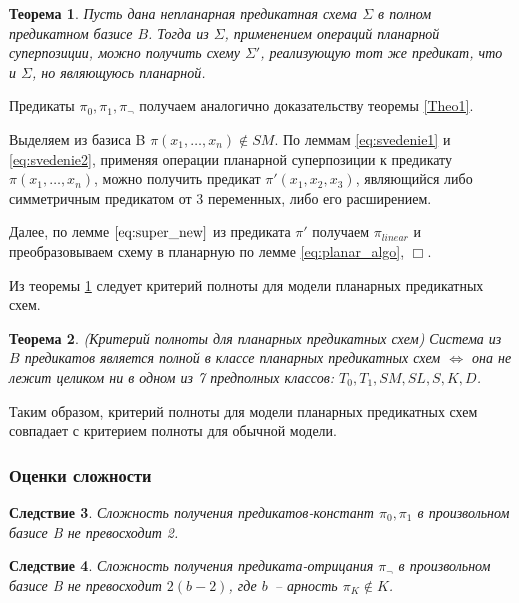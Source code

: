 \documentclass[12pt]{article}
\newtheorem{theorem}{Теорема}[section]
\newtheorem{corollary}[theorem]{Следствие}
\newenvironment{proof}[1][Доказательство]{\begin{trivlist}
\item[\hskip \labelsep {\bfseries #1}]}{\end{trivlist}}
\begin{document}
\begin{theorem}
\label{Theo2}
Пусть дана непланарная предикатная схема $\Sigma$ в полном предикатном базисе $B$. 
Тогда из $\Sigma$, применением операций планарной суперпозиции, можно получить схему $\Sigma'$,
реализующую тот же предикат, что и $\Sigma$, но являющуюсь планарной.
\end{theorem}

\begin{proof}
Предикаты $\pi_0, \pi_1, \pi_{\neg}$ получаем аналогично доказательству теоремы \ref{Theo1}.

Выделяем из базиса B $\pi(x_1, \dots, x_n) \notin SM$. По леммам \ref{eq:svedenie1} и \ref{eq:svedenie2}, 
применяя операции планарной суперпозиции к предикату $\pi(x_1, \dots, x_n)$, можно получить 
предикат $\pi'(x_1, x_2, x_3)$, являющийся либо симметричным предикатом от 3 переменных, либо его расширением. 

Далее, по лемме $\ref{eq:super_new}$ из предиката $\pi'$ получаем $\pi_{linear}$ и преобразовываем схему в планарную
по лемме \ref{eq:planar_algo}, $\Box$.
\end{proof}

Из теоремы \ref{Theo2} следует критерий полноты для модели планарных предикатных схем.

\begin{theorem}
(Критерий полноты для планарных предикатных схем)
Система из $B$ предикатов является полной в классе планарных предикатных схем $\iff$
она не лежит целиком ни в одном из 7 предполных классов: $T_0, T_1, SM, SL, S, K, D$. 
\end{theorem}

Таким образом, критерий полноты для модели планарных предикатных схем совпадает с критерием полноты для обычной модели.

\subsubsection{Оценки сложности}

\begin{corollary}
\label{corol:const}
Сложность получения предикатов-констант $\pi_0, \pi_1$ в произвольном базисе B не превосходит 2.
\end{corollary}

\begin{corollary}
\label{corol:negate}
Сложность получения предиката-отрицания $\pi_{\neg}$ в произвольном базисе B не превосходит $2(b-2)$, 
где $b$~-- арность $\pi_K \notin K$.
\end{corollary}
\end{document}
